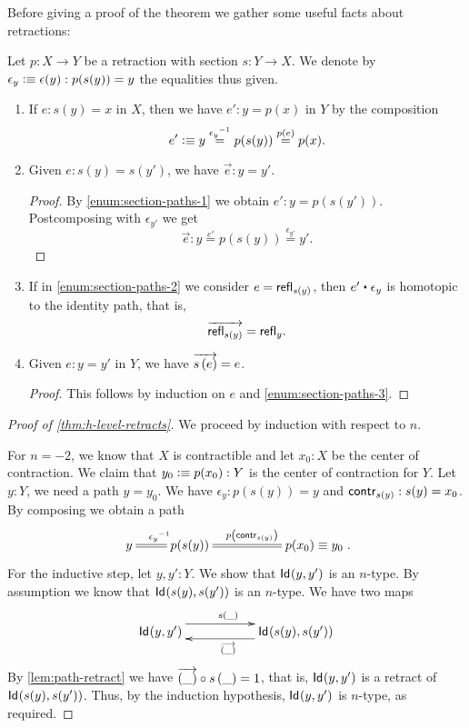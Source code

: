 Before giving a proof of the theorem we gather some useful facts about retractions:

\begin{lem}\label{lem:path-retract}
 Let $p \colon X \to Y$ be a retraction with section $s \colon Y \to X$.
 We denote by $\epsilon_y \defeq \epsilon(y) : p(s(y)) = y$ the equalities thus given.
 \begin{enumerate}
  \item \label{enum:section-paths-1}
      If $e : s(y) = x$ in $X$, then we have $e' :  y = p(x)$ in $Y$
        by the composition
     \[e' \defeq y \stackrel{\opp{\epsilon_y}}{=} p(s(y)) \stackrel{\map{p}{e}}{=} p(x).\]
  \item \label{enum:section-paths-2}
      Given $e : s(y) = s(y')$, we have $\vec e : y = y'$.
     \begin{proof}
        By \ref{enum:section-paths-1} we obtain $e' : y = p(s(y'))$.
        Postcomposing with $\epsilon_{y'}$ we get
           \[ \overrightarrow{e} : y \stackrel{e'}{=} p(s(y)) \stackrel{\epsilon_{y'}}{=} y'  . \]
     \end{proof}
  \item \label{enum:section-paths-3}
        If in \ref{enum:section-paths-2} we consider $e = \refl{s(y)}$, then $e' \ct \epsilon_{y}$
        is homotopic to the identity path, that is,
          \[ \overrightarrow{\refl{s(y)}} = \refl{y}  . \]
  \item Given $e : y = y'$ in $Y$, we have $\overrightarrow{\map{s}{e}} = e$.
      \begin{proof}
       This follows by induction on $e$ and \ref{enum:section-paths-3}.
      \end{proof}
 \end{enumerate}

\end{lem}


\begin{proof}[Proof of \autoref{thm:h-level-retracts}]
 We proceed by induction with respect to $n$.

 For $n=-2$, we know that $X$ is contractible and let $x_0 : X$ be the center of contraction.
 We claim that $y_0 \defeq p(x_0) : Y$ is the center of contraction for $Y$.
 Let $y : Y$, we need a path $y = y_0$. We have $\epsilon_y : p(s(y)) = y$ and $\contr_{s(y)} : s(y) = x_0$.
 By composing we obtain a path
 \[\xymatrix { y \ar@{=}[r]^{\opp{\epsilon_y}} & p(s(y)) \ar@{=}[rr]^{\map{p}{\contr_{s(y)}}} && p(x_0) \equiv y_0 } . \]
 For the inductive step, let $y, y' : Y$. We show that $\idtype {y}{y'}$ is an $n$-type.
 By assumption we know that $\idtype{s(y)}{s(y')}$ is an $n$-type.
 We have two maps
 \[\xymatrix{\idtype{y}{y'} \ar@<1.5ex>[rr]^{\map{s}{\_}} & & \idtype{s(y)}{s(y')} \ar@<1.2ex>[ll]^{\overrightarrow{(\_)}}}\]
  By \autoref{lem:path-retract} we have $\comp{\map{s}{\_}}{\overrightarrow{(\_)}} = 1$,
   that is, $\idtype {y}{y'}$ is a retract of $\idtype{s(y)}{s(y')}$.
    Thus, by the induction hypothesis, $\idtype {y}{y'}$ is $n$-type, as required.
\end{proof}

